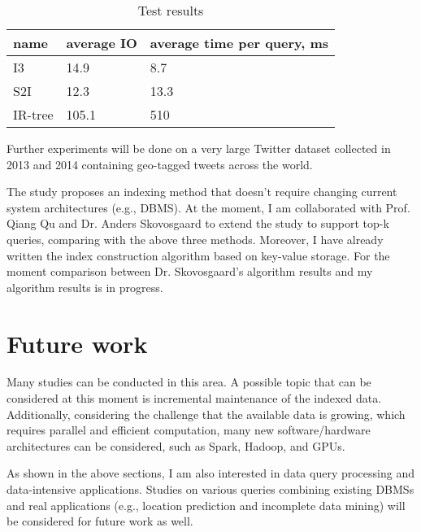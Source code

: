 \documentclass[11pt,a4paper]{article}
\begin{document}
 	\begin{table}[h]
 		\centering
 		\caption{Test results} 
 		\begin{tabular}{lll}
 			name & average IO & average time per query, ms \\ \hline
 			I3 & 14.9 & 8.7 \\
 			S2I & 12.3 & 13.3  \\
 			IR-tree & 105.1 & 510
 		\end{tabular}
 	\end{table}
 	
 	Further experiments will be done on a very large Twitter dataset collected in 2013 and 2014 containing geo-tagged tweets across the world. 
 	
 	The study \cite{skovsgaard2014top} proposes an indexing method that doesn't require changing current system architectures (e.g., DBMS). At the moment, I am collaborated with Prof. Qiang Qu and Dr. Anders Skovosgaard to extend the study to support top-k queries, comparing with the above three methods. Moreover, I have already written the index construction algorithm based on key-value storage. For the moment comparison between  Dr. Skovosgaard's algorithm results and my algorithm results is in progress.
 	
 	\section{Future work}
 	Many studies can be conducted in this area. A possible topic that can be considered at this moment is incremental maintenance of the indexed data. Additionally, considering the challenge that the available data is growing, which requires parallel and efficient computation, many new software/hardware architectures can be considered, such as Spark, Hadoop, and GPUs. 
 	
 	As shown in the above sections, I am also interested in data query processing and data-intensive applications. Studies on various queries combining existing DBMSs and real applications (e.g., location prediction and incomplete data mining) will be considered for future work as well.
 	
 	
 	
 	
 
\end{document}
